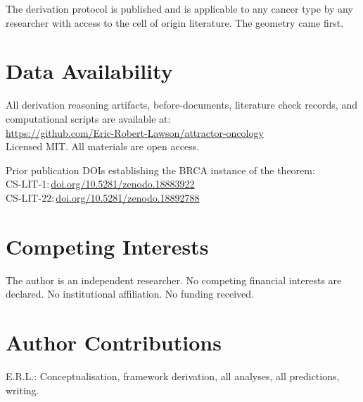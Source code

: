 \documentclass[11pt, a4paper]{article}
\begin{document}
The derivation protocol is published and is
applicable to any cancer type by any researcher
with access to the cell of origin literature.
The geometry came first.

\section*{Data Availability}

All derivation reasoning artifacts, before-documents,
literature check records, and computational scripts
are available at:\\
\url{https://github.com/Eric-Robert-Lawson/attractor-oncology}\\
Licensed MIT. All materials are open access.

Prior publication DOIs establishing the BRCA instance
of the theorem:\\
CS-LIT-1:\,\href{https://doi.org/10.5281/zenodo.18883922}{doi.org/10.5281/zenodo.18883922}\\
CS-LIT-22:\,\href{https://doi.org/10.5281/zenodo.18892788}{doi.org/10.5281/zenodo.18892788}

\section*{Competing Interests}

The author is an independent researcher.
No competing financial interests are declared.
No institutional affiliation. No funding received.

\section*{Author Contributions}

E.R.L.: Conceptualisation, framework derivation,
all analyses, all predictions, writing.
\end{document}
